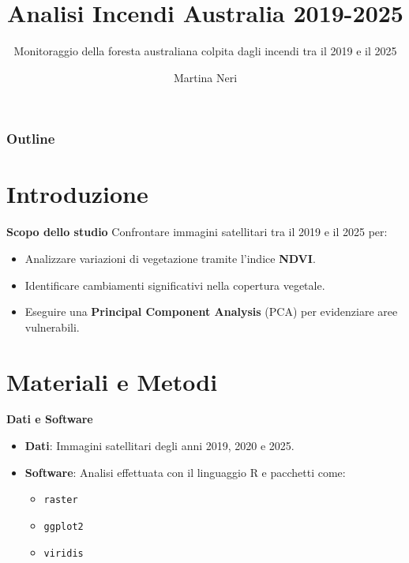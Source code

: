\documentclass{beamer}
\title{\textbf{\textcolor{verdeScuro}{Analisi Incendi Australia 2019-2025}}}
\subtitle{Monitoraggio della foresta australiana colpita dagli incendi tra il 2019 e il 2025}
\author{Martina Neri}
\begin{document}
\maketitle

\begin{frame}
\frametitle{Outline}
\tableofcontents
\end{frame}

\section{Introduzione}

\begin{frame}{\textbf{Scopo dello studio}}
Confrontare immagini satellitari tra il 2019 e il 2025 per:
\begin{itemize}
    \item Analizzare variazioni di vegetazione tramite l'indice \textbf{NDVI}.
    \item Identificare cambiamenti significativi nella copertura vegetale.
    \item Eseguire una \textbf{Principal Component Analysis} (PCA) per evidenziare aree vulnerabili.
\end{itemize}
\end{frame}

\section{Materiali e Metodi}

\begin{frame}{\textbf{Dati e Software}}
\begin{itemize}
    \item \textbf{Dati}: Immagini satellitari degli anni 2019, 2020 e 2025.
    \item \textbf{Software}: Analisi effettuata con il linguaggio R e pacchetti come:
    \begin{itemize}
        \item \texttt{raster}
        \item \texttt{ggplot2}
        \item \texttt{viridis}
    \end{itemize}
\end{itemize}
\end{frame}
\end{document}
